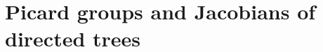 \documentclass[11pt,reqno]{amsart}
\DeclareMathOperator{\Pic}{Pic}
\DeclareMathOperator{\Jac}{Jac}
\DeclareMathOperator{\Deg}{deg}
\theoremstyle{definition}
\theoremstyle{plain}
\begin{document}


\section{Picard groups and Jacobians of directed trees}\label{section: trees}
\end{document}

